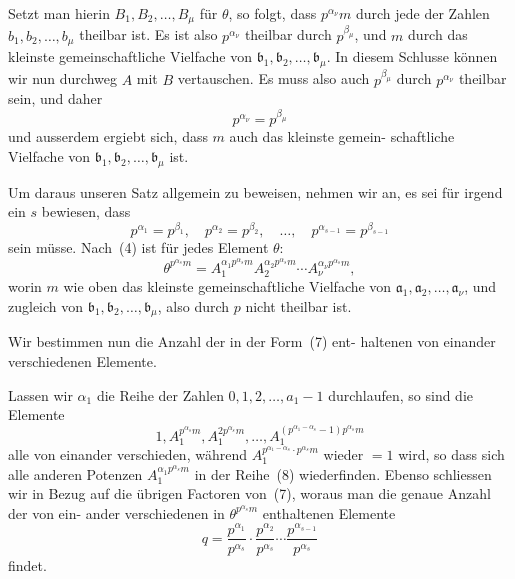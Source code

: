 \documentclass[12pt,a4paper]{article}
\theoremstyle{plain}
\theoremstyle{definition}
\theoremstyle{remark}
\begin{document}
Setzt man hierin $B_1, B_2, \ldots, B_\mu$ für $\theta$, so folgt, dass $p^{\alpha_\nu} m$
durch jede der Zahlen $b_1, b_2, \ldots, b_\mu$ theilbar ist. Es ist also $p^{\alpha_\nu}$
theilbar durch $p^{\beta_\mu}$, und $m$ durch das kleinste gemeinschaftliche
Vielfache von $\mathfrak{b}_1, \mathfrak{b}_2, \ldots, \mathfrak{b}_\mu$. In diesem Schlusse können wir nun
durchweg $A$ mit $B$ vertauschen. Es muss also auch $p^{\beta_\mu}$ durch $p^{\alpha_\nu}$
theilbar sein, und daher
\begin{equation}\tag{5}
p^{\alpha_\nu} = p^{\beta_\mu}
\end{equation}
und ausserdem ergiebt sich, dass $m$ auch das kleinste gemein-
schaftliche Vielfache von $\mathfrak{b}_1, \mathfrak{b}_2, \ldots, \mathfrak{b}_\mu$ ist.

Um daraus unseren Satz allgemein zu beweisen, nehmen
wir an, es sei für irgend ein $s$ bewiesen, dass
\begin{equation}\tag{6}
p^{\alpha_1} = p^{\beta_1}, \quad p^{\alpha_2} = p^{\beta_2}, \quad \ldots, \quad p^{\alpha_{s-1}} = p^{\beta_{s-1}}
\end{equation}
sein müsse. Nach~(4) ist für jedes Element $\theta$:
\begin{equation}\tag{7}
\theta^{p^{\alpha_s} m} = A_1^{\alpha_1 p^{\alpha_s} m} A_2^{\alpha_2 p^{\alpha_s} m} \cdots A_\nu^{\alpha_\nu p^{\alpha_s} m},
\end{equation}
worin $m$ wie oben das kleinste gemeinschaftliche Vielfache von
$\mathfrak{a}_1, \mathfrak{a}_2, \ldots, \mathfrak{a}_\nu$, und zugleich von $\mathfrak{b}_1, \mathfrak{b}_2, \ldots, \mathfrak{b}_\mu$, also durch $p$ nicht
theilbar ist.

Wir bestimmen nun die Anzahl der in der Form~(7) ent-
haltenen von einander verschiedenen Elemente.

Lassen wir $\alpha_1$ die Reihe der Zahlen $0, 1, 2, \ldots, a_1 - 1$
durchlaufen, so sind die Elemente
\begin{equation}\tag{8}
1, A_1^{p^{\alpha_s} m}, A_1^{2p^{\alpha_s} m}, \ldots, A_1^{(p^{\alpha_1 - \alpha_s} - 1) p^{\alpha_s} m}
\end{equation}
alle von einander verschieden, während $A_1^{p^{\alpha_1 - \alpha_s} \cdot p^{\alpha_s} m}$ wieder $= 1$
wird, so dass sich alle anderen Potenzen $A_1^{\alpha_1 p^{\alpha_s} m}$ in der Reihe~(8)
wiederfinden. Ebenso schliessen wir in Bezug auf die übrigen
Factoren von~(7), woraus man die genaue Anzahl der von ein-
ander verschiedenen in $\theta^{p^{\alpha_s} m}$ enthaltenen Elemente
\begin{equation}\tag{9}
q = \frac{p^{\alpha_1}}{p^{\alpha_s}} \cdot \frac{p^{\alpha_2}}{p^{\alpha_s}} \cdots \frac{p^{\alpha_{s-1}}}{p^{\alpha_s}}
\end{equation}
findet.
\end{document}

